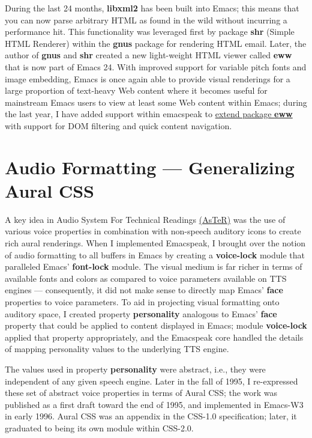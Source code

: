 \documentclass[11pt]{article}
\begin{document}
During the last 24 months, \textbf{libxml2} has been built into Emacs;
this means that you can now parse arbitrary HTML as found in the
wild without incurring a performance hit. This functionality was
leveraged first by package \textbf{shr} (Simple HTML Renderer) within
the \textbf{gnus} package for rendering HTML email. Later, the author of
\textbf{gnus} and \textbf{shr} created a new light-weight HTML viewer called
\textbf{eww} that is now part of Emacs 24. With improved support for
variable pitch fonts and image embedding, Emacs is once again
able to provide visual renderings for a large proportion of
text-heavy Web content where it becomes useful for mainstream
Emacs users to view at least some Web content within Emacs;
during the last year, I have added support within emacspeak to
\href{http://emacspeak.blogspot.com/2014/05/emacspeak-eww-updates-for-complete.html}{extend package \textbf{eww}} with support for DOM filtering and quick
content navigation.

\section{Audio Formatting —  Generalizing Aural CSS}
\label{sec-8}


A key idea in Audio System For Technical Readings \href{http://www.cs.cornell.edu/home/raman/aster/aster-toplevel.html}{(AsTeR)} was the
use of various voice properties in combination with non-speech
auditory icons to create rich aural renderings. When I
implemented Emacspeak, I brought over the notion of audio
formatting to all buffers in Emacs by creating a \textbf{voice-lock}
module that paralleled Emacs' \textbf{font-lock} module. The visual
medium is far richer in terms of available fonts and colors as
compared to voice parameters available on TTS engines —
consequently, it did not make sense to directly map Emacs' \textbf{face}
properties to voice parameters. To aid in projecting visual
formatting onto auditory space, I created property \textbf{personality}
analogous to Emacs' \textbf{face} property that could be applied to
content displayed in Emacs; module \textbf{voice-lock} applied that
property appropriately, and the Emacspeak core handled the
details of mapping personality values to the underlying TTS
engine.

The values used in property \textbf{personality} were abstract, i.e.,
they were independent of any given speech engine. Later in the
fall of 1995, I re-expressed these set of abstract voice
properties in terms of Aural CSS; the work was published as a
first draft toward the end of 1995, and implemented in Emacs-W3
in early 1996. Aural CSS was an appendix in the CSS-1.0
specification; later, it graduated to being its own module within
CSS-2.0.
\end{document}
